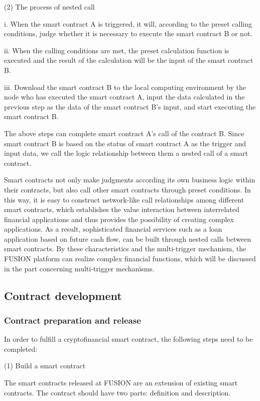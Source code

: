 \documentclass[a4paper,12pt]{article}
\begin{document}
(2) The process of nested call

i. When the smart contract A is triggered, it will, according to the preset calling conditions, judge whether it is necessary to execute the smart contract B or not.

ii. When the calling conditions are met, the preset calculation function is executed and the result of the calculation will be the input of the smart contract B.

iii. Download the smart contract B to the local computing environment by the node who has executed the smart contract A, input the data calculated in the previous step as the data of the smart contract B's input, and start executing the smart contract B.

The above steps can complete smart contract A's call of the contract B. Since smart contract B is based on the status of smart contract A as the trigger and input data, we call the logic relationship between them a nested call of a smart contract.

Smart contracts not only make judgments according its own business logic within their contracts, but also call other smart contracts through preset conditions. In this way, it is easy to construct network-like call relationships among different smart contracts, which establishes the value interaction between interrelated financial applications and thus provides the possibility of creating complex applications. As a result, sophisticated financial services such as a loan application based on future cash flow, can be built through nested calls between smart contracts. By these characteristics and the multi-trigger mechanism, the FUSION platform can realize complex financial functions, which will be discussed in the part concerning multi-trigger mechanisms.

\subsection{Contract development}

\subsubsection{Contract preparation and release}

In order to fulfill a cryptofinancial smart contract, the following steps need to be completed:

(1) Build a smart contract

The smart contracts released at FUSION are an extension of existing smart contracts. The contract should have two parts: definition and description.
\end{document}
